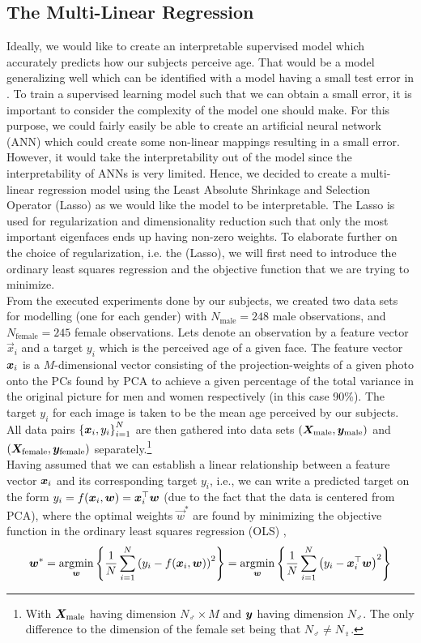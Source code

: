 \subsection{The Multi-Linear Regression}
Ideally, we would like to create an interpretable supervised model which accurately predicts how our subjects perceive age. That would be a model generalizing well which can be identified with a model having a small test error in . To train a supervised learning model such that we can obtain a small error, it is important to consider the complexity of the model one should make. For this purpose, we could fairly easily be able to create an artificial neural network (ANN) which could create some non-linear mappings resulting in a small error. However, it would take the interpretability out of the model since the interpretability of ANNs is very limited. Hence, we decided to create a multi-linear regression model using the Least Absolute Shrinkage and Selection Operator (Lasso) as we would like the model to be interpretable. The Lasso is used for regularization and dimensionality reduction such that only the most important eigenfaces ends up having non-zero weights. To elaborate further on the choice of regularization, i.e. the  (Lasso), we will first need to introduce the ordinary least squares regression and the objective function that we are trying to minimize.  \\
From the executed experiments done by our subjects, we created two data sets for modelling (one for each gender) with $N_{\mathrm{male}} = 248$ male observations, and $N_{\mathrm{female}}=245$ female observations. Lets denote an observation by a feature vector $\vec{x}_i$ and a target $y_i$ which is the perceived age of a given face. The feature vector $\bm{x}_i$ is a $M$-dimensional vector consisting of the projection-weights of a given photo onto the PCs found by PCA to achieve a given percentage of the total variance in the original picture for men and women respectively (in this case 90\%). The target $y_i$ for each image is taken to be the mean age perceived by our subjects. All data pairs $\left\{ {\bm{x}_i,y_i} \right\}_{i=1}^N$ are then gathered into data sets $\qty(\bm{X}_{\mathrm{male}},\bm{y}_{\mathrm{male}})$ and $\qty(\bm{X}_{\mathrm{female}},\bm{y}_{\mathrm{female}})$ separately.\footnote{With $\bm{X}_{\mathrm{male}}$ having dimension $N_{\male} \times M$ and $\bm{y}$ having dimension $N_{\male}$. The only difference to the dimension of the female set being that $N_{\male} \neq N_{\female}$.} \\ 
Having assumed that we can establish a linear relationship between a feature vector $\bm{x}_i$ and its corresponding target $y_i$, i.e., we can write a predicted target on the form $y_i = f\qty(\bm{x}_i,\bm{w})= \bm{x}_i^{\top} \bm{w}$ (due to the fact that the data is centered from PCA), where the optimal weights $\vec{w}^{\ast}$ are found by minimizing the objective function in the ordinary least squares regression (OLS) \cite{allhailkingMorten},
\begin{equation}\label{eq:RSS}
    \bm{w}^{\ast} = \operatorname*{\arg\!\min}_{\bm{w}}\left\{ { \dfrac{1}{N} \sum_{i=1}^N \qty(y_i - f\qty(\bm{x}_i,\bm{w}))^2 } \right\} = \operatorname*{\arg\!\min}_{\bm{w}}\left\{ {\dfrac{1}{N} \sum_{i=1}^N \qty(y_i - \bm{x}_i^{\top} \bm{w})^2 } \right\}
\end{equation}

